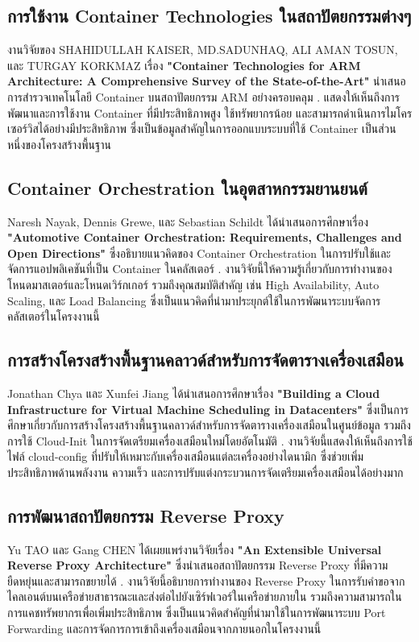\subsection{การใช้งาน Container Technologies ในสถาปัตยกรรมต่างๆ}
\hspace*{1.5em} %
งานวิจัยของ SHAHIDULLAH KAISER, MD.SADUNHAQ, ALI AMAN TOSUN, และ TURGAY KORKMAZ เรื่อง \textbf{"Container Technologies for ARM Architecture: A Comprehensive Survey of the State-of-the-Art"} นำเสนอการสำรวจเทคโนโลยี Container บนสถาปัตยกรรม ARM อย่างครอบคลุม \parencite{kaiser2022_container_arm}. แสดงให้เห็นถึงการพัฒนาและการใช้งาน Container ที่มีประสิทธิภาพสูง ใช้ทรัพยากรน้อย และสามารถดำเนินการไมโครเซอร์วิสได้อย่างมีประสิทธิภาพ ซึ่งเป็นข้อมูลสำคัญในการออกแบบระบบที่ใช้ Container เป็นส่วนหนึ่งของโครงสร้างพื้นฐาน

\subsection{Container Orchestration ในอุตสาหกรรมยานยนต์}
\hspace*{1.5em} %
Naresh Nayak, Dennis Grewe, และ Sebastian Schildt ได้นำเสนอการศึกษาเรื่อง \textbf{"Automotive Container Orchestration: Requirements, Challenges and Open Directions"} ซึ่งอธิบายแนวคิดของ Container Orchestration ในการปรับใช้และจัดการแอปพลิเคชันที่เป็น Container ในคลัสเตอร์ \parencite{nayak2023_automotive_orchestration}. งานวิจัยนี้ให้ความรู้เกี่ยวกับการทำงานของโหนดมาสเตอร์และโหนดเวิร์กเกอร์ รวมถึงคุณสมบัติสำคัญ เช่น High Availability, Auto Scaling, และ Load Balancing ซึ่งเป็นแนวคิดที่นำมาประยุกต์ใช้ในการพัฒนาระบบจัดการคลัสเตอร์ในโครงงานนี้

\subsection{การสร้างโครงสร้างพื้นฐานคลาวด์สำหรับการจัดตารางเครื่องเสมือน}
\hspace*{1.5em} %
Jonathan Chya และ Xunfei Jiang ได้นำเสนอการศึกษาเรื่อง \textbf{"Building a Cloud Infrastructure for Virtual Machine Scheduling in Datacenters"} ซึ่งเป็นการศึกษาเกี่ยวกับการสร้างโครงสร้างพื้นฐานคลาวด์สำหรับการจัดตารางเครื่องเสมือนในศูนย์ข้อมูล รวมถึงการใช้ Cloud-Init ในการจัดเตรียมเครื่องเสมือนใหม่โดยอัตโนมัติ \parencite{chya2024_vm_scheduling}. งานวิจัยนี้แสดงให้เห็นถึงการใช้ไฟล์ cloud-config ที่ปรับให้เหมาะกับเครื่องเสมือนแต่ละเครื่องอย่างไดนามิก ซึ่งช่วยเพิ่มประสิทธิภาพด้านพลังงาน ความเร็ว และการปรับแต่งกระบวนการจัดเตรียมเครื่องเสมือนได้อย่างมาก

\subsection{การพัฒนาสถาปัตยกรรม Reverse Proxy}
\hspace*{1.5em} %
Yu TAO และ Gang CHEN ได้เผยแพร่งานวิจัยเรื่อง \textbf{"An Extensible Universal Reverse Proxy Architecture"} ซึ่งนำเสนอสถาปัตยกรรม Reverse Proxy ที่มีความยืดหยุ่นและสามารถขยายได้ \parencite{tao2016_reverse_proxy}. งานวิจัยนี้อธิบายการทำงานของ Reverse Proxy ในการรับคำขอจากไคลเอนต์บนเครือข่ายสาธารณะและส่งต่อไปยังเซิร์ฟเวอร์ในเครือข่ายภายใน รวมถึงความสามารถในการแคชทรัพยากรเพื่อเพิ่มประสิทธิภาพ ซึ่งเป็นแนวคิดสำคัญที่นำมาใช้ในการพัฒนาระบบ Port Forwarding และการจัดการการเข้าถึงเครื่องเสมือนจากภายนอกในโครงงานนี้
